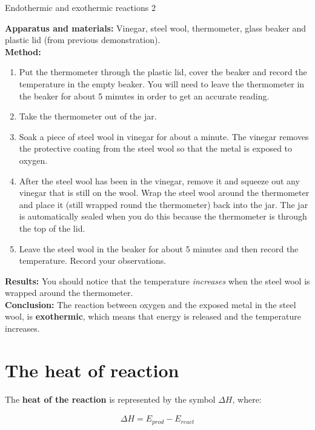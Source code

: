 \begin{g_experiment}{Endothermic and exothermic reactions 2}{

\textbf{Apparatus and materials: } Vinegar, steel wool, thermometer, glass beaker and plastic lid (from previous demonstration).\\
\textbf{Method: }
\begin{enumerate}
\item{Put the thermometer through the plastic lid, cover the beaker and record the temperature in the empty beaker. You will need to leave the thermometer in the beaker for about 5 minutes in order to get an accurate reading.}
\item{Take the thermometer out of the jar.}
\item{Soak a piece of steel wool in vinegar for about a minute. The vinegar removes the protective coating from the steel wool so that the metal is exposed to oxygen.}
\item{After the steel wool has been in the vinegar, remove it and squeeze out any vinegar that is still on the wool. Wrap the steel wool around the thermometer and place it (still wrapped round the thermometer) back into the jar. The jar is automatically sealed when you do this because the thermometer is through the top of the lid.}
\item{Leave the steel wool in the beaker for about 5 minutes and then record the temperature. Record your observations.\\}
\end{enumerate}
\textbf{Results: } You should notice that the temperature \textit{increases} when the steel wool is wrapped around the thermometer. \\
\textbf{Conclusion: } The reaction between oxygen and the exposed metal in the steel wool, is \textbf{exothermic}, which means that energy is released and the temperature increases.
}
\end{g_experiment}
\pagebreak
\section{The heat of reaction}

The \textbf{heat of the reaction} is represented by the symbol $\Delta H$, where:

\begin{eqnarray*}
\Delta H = E_{prod} - E_{react}
\end{eqnarray*}

